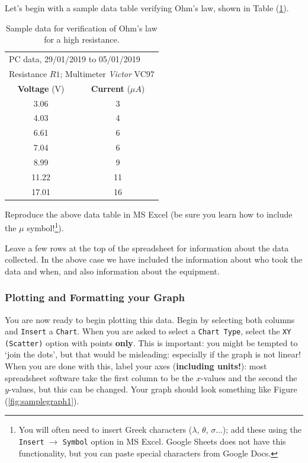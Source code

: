 Let's begin with a sample data table verifying Ohm's law, shown in Table (\ref{table:ohm}).

\begin{table}[!htb]
\centering
\begin{tabular}{|c|c|}
\hline
\rowcolor{orange!25}
\hline
\multicolumn{2}{|l|}{Experiment $n$: \textbf{Verification of Ohm's Law for high resistance}}\\
\hline
\multicolumn{2}{|l|}{PC data, 29/01/2019 to 05/01/2019}\\
\hline
\multicolumn{2}{|l|}{Resistance $R1$; Multimeter \textit{Victor} VC97}\\
\hline
\rowcolor{orange!50}
\textbf{Voltage} {\color{black}(V)} & \textbf{Current} {\color{black}($\mu A$)}\\
\hline
3.06 & 3\\
4.03 & 4\\
6.61 & 6\\
7.04 & 6\\
8.99 & 9\\
11.22& 11\\
17.01& 16\\
 \hline
\end{tabular}
\caption{Sample data for verification of Ohm’s law for a high resistance.}
\label{table:ohm}
\end{table}

Reproduce the above data table in MS Excel (be sure you learn how to include the $\mu$ symbol!\footnote{You will often need to insert Greek characters ($\lambda$, $\theta$, $\sigma\hdots$); add these using the \texttt{Insert} $\rightarrow$ \texttt{Symbol} option in MS Excel. Google Sheets does not have this functionality, but you can paste special characters from Google Docs.}).

\begin{tip}
Leave a few rows at the top of the spreadsheet for information about the data collected. In the above case we have included the information about who took the data and when, and also information about the equipment.
\end{tip}

\subsubsection{Plotting and Formatting your Graph}

You are now ready to begin plotting this data. Begin by selecting both columns and \texttt{Insert} a \texttt{Chart}. When you are asked to select a \texttt{Chart Type}, select the \texttt{XY (Scatter)} option with points \textbf{only}. This is important: you might be tempted to `join the dots', but that would be misleading: especially if the graph is not linear! When you are done with this, label your axes (\textbf{including units!}): most spreadsheet software take the first column to be the $x$-values and the second the $y$-values, but this can be changed. Your graph should look something like Figure (\ref{fig:samplegraph1}). 


